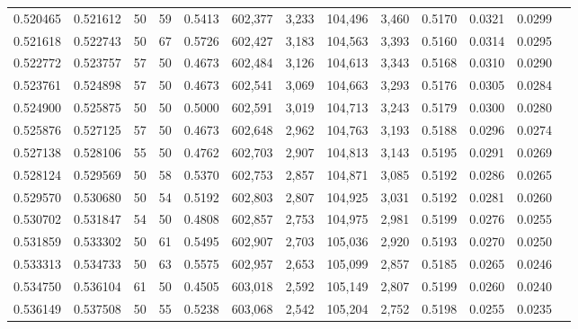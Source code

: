 \begin{tabular}{rrrrrrrrrrrrr}
0.520465 & 0.521612 &    50 &  59 &                                     0.5413 & 602,377 &   3,233 & 104,496 &   3,460 & 0.5170 & 0.0321 & 0.0299 \\
0.521618 & 0.522743 &    50 &  67 &                                     0.5726 & 602,427 &   3,183 & 104,563 &   3,393 & 0.5160 & 0.0314 & 0.0295 \\
0.522772 & 0.523757 &    57 &  50 &                                     0.4673 & 602,484 &   3,126 & 104,613 &   3,343 & 0.5168 & 0.0310 & 0.0290 \\
0.523761 & 0.524898 &    57 &  50 &                                     0.4673 & 602,541 &   3,069 & 104,663 &   3,293 & 0.5176 & 0.0305 & 0.0284 \\
0.524900 & 0.525875 &    50 &  50 &                                     0.5000 & 602,591 &   3,019 & 104,713 &   3,243 & 0.5179 & 0.0300 & 0.0280 \\
0.525876 & 0.527125 &    57 &  50 &                                     0.4673 & 602,648 &   2,962 & 104,763 &   3,193 & 0.5188 & 0.0296 & 0.0274 \\
0.527138 & 0.528106 &    55 &  50 &                                     0.4762 & 602,703 &   2,907 & 104,813 &   3,143 & 0.5195 & 0.0291 & 0.0269 \\
0.528124 & 0.529569 &    50 &  58 &                                     0.5370 & 602,753 &   2,857 & 104,871 &   3,085 & 0.5192 & 0.0286 & 0.0265 \\
0.529570 & 0.530680 &    50 &  54 &                                     0.5192 & 602,803 &   2,807 & 104,925 &   3,031 & 0.5192 & 0.0281 & 0.0260 \\
0.530702 & 0.531847 &    54 &  50 &                                     0.4808 & 602,857 &   2,753 & 104,975 &   2,981 & 0.5199 & 0.0276 & 0.0255 \\
0.531859 & 0.533302 &    50 &  61 &                                     0.5495 & 602,907 &   2,703 & 105,036 &   2,920 & 0.5193 & 0.0270 & 0.0250 \\
0.533313 & 0.534733 &    50 &  63 &                                     0.5575 & 602,957 &   2,653 & 105,099 &   2,857 & 0.5185 & 0.0265 & 0.0246 \\
0.534750 & 0.536104 &    61 &  50 &                                     0.4505 & 603,018 &   2,592 & 105,149 &   2,807 & 0.5199 & 0.0260 & 0.0240 \\
0.536149 & 0.537508 &    50 &  55 &                                     0.5238 & 603,068 &   2,542 & 105,204 &   2,752 & 0.5198 & 0.0255 & 0.0235 \\

\end{tabular}
